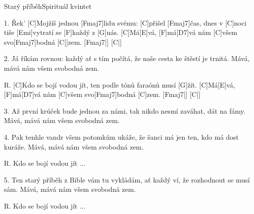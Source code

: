 \begin{song}{Starý příběh}{Spirituál kvintet}

\begin{xverse}{1. }
Řek' [C]Mojžíš jednou [Fmaj7]lidu svému: [C]přišel [Fmaj7]{}čas,
dnes v [C]noci tiše [Emi]vytratí se [F]každý z [G]nás.
[C]Má[E]vá, [F]má[D7]vá nám [C]všem svo[Fmaj7]bodná [C|]{zem.} [Fmaj7|]{} [C|]{}
\end{xverse}


\begin{xverse}{2. }
Já říkám rovnou: každý ať s tím počítá,
že naše cesta ke štěstí je trnitá.
Mává, mává nám všem svobodná zem.
\end{xverse}


\begin{xverse}{R. }
[C]Kdo se bojí vodou jít,
ten podle tónů faraónů musí [G]{}žít.
[C]Má[E]vá, [F]má[D7]vá nám [C]všem svo[Fmaj7]bodná [C]{zem.} [Fmaj7|]{} [C|]{}
\end{xverse}


\begin{xverse}{3. }
Až první krúček bude jednou za námi,
tak nikdo nesmí zaváhat, dát na fámy.
Mává, mává nám všem svobodná zem.
\end{xverse}


\begin{xverse}{4. }
Pak tenhle vandr všem potomkům ukáže,
že šanci má jen ten, kdo má dost kuráže.
Mává, mává nám všem svobodná zem.
\end{xverse}


\begin{xverse}{R. }
Kdo se bojí vodou jít ...
\end{xverse}


\begin{xverse}{5. }
Ten starý příběh z Bible vám tu vykládám,
ať každý ví, že rozhodnout se musí sám.
Mává, mává nám všem svobodná zem.
\end{xverse}


\begin{xverse}{R. }
Kdo se bojí vodou jít ...
\end{xverse}

\end{song}

